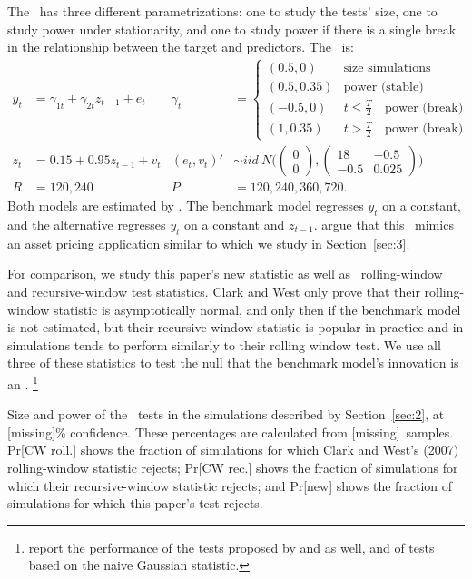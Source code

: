 \documentclass[12pt,fleqn]{article}
\providecommand\testsize{[missing]}
\providecommand\totalsims{[missing]}
\begin{document}
The \dgp\ has three different parametrizations: one to study the
tests' size, one to study power under stationarity, and one to study
power if there is a single break in the relationship between the
target and predictors.  The \dgp\ is:
\begin{align*}
  y_t &= \gamma_{1t} + \gamma_{2t} z_{t-1} + e_t &
  \gamma_t &=
  \begin{cases}
    (0.5, 0)    & \text{size simulations} \\
    (0.5, 0.35) & \text{power (stable)} \\
    (-0.5, 0)    & t \leq \tfrac{T}{2} \quad \text{power (break)} \\
    (1, 0.35) & t > \tfrac{T}{2} \quad \text{power (break)}
  \end{cases}\\\nonumber
  z_t &= 0.15 + 0.95 z_{t-1} + v_t &
  (e_t, v_t)' &\sim iid\ N\Bigg(\begin{pmatrix} 0 \\ 0
  \end{pmatrix}
   , \begin{pmatrix} 18 & -
    0.5 \\ -0.5 & 0.025 \end{pmatrix}\Bigg)
  \\ R &= 120, 240 & P &= 120, 240, 360, 720.
\end{align*}
Both models are estimated by \ols. The benchmark model regresses $y_t$
on a constant, and the alternative regresses $y_t$ on a constant and
$z_{t-1}$.  \citet{ClW:07} argue that this \dgp\ mimics an asset
pricing application similar to  which we study in
Section~\ref{sec:3}.

For comparison, we study this paper's new statistic as well as
\poscw\ rolling-window and recursive-window test statistics.  Clark and West
only prove that their rolling-window statistic is asymptotically
normal, and only then if the benchmark model is not estimated, but
their recursive-window statistic is popular in practice and in
simulations tends to perform similarly to their rolling window test.
We use all three of these statistics to test the null that the
benchmark model's innovation is an \mds.%
\footnote{\citet{ClW:07}
  report the performance of the tests proposed by \citet{CCS:01} and
  \citet{ClM:05} as well, and of tests based on the naive Gaussian
  statistic.} %

\begin{table}[tb]
  \centering
  
  \caption{Size and power of the \oos\ tests in the simulations
    described by Section~\ref{sec:2}, at
    \testsize\% confidence.  These percentages are calculated from \totalsims\
    samples.  Pr[CW roll.] shows the fraction of simulations for
    which Clark and West's (2007) rolling-window statistic rejects;
    Pr[CW rec.] shows the fraction of simulations for which
    their recursive-window statistic rejects; and Pr[new] shows the fraction of
    simulations for which this paper's test rejects.}
\label{tab:mc1}
\end{table}
\end{document}
